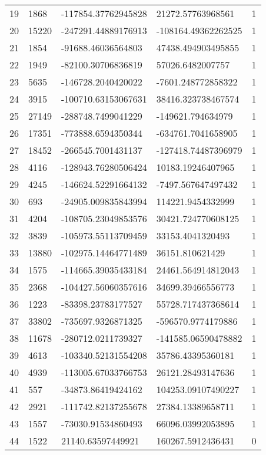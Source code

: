 \begin{longtable}{lllll}
    19 & 1868 & -117854.37762945828 & 21272.57763968561 & 1 \\
    20 & 15220 & -247291.44889176913 & -108164.49362262525 & 1 \\
    21 & 1854 & -91688.46036564803 & 47438.494903495855 & 1 \\
    22 & 1949 & -82100.30706836819 & 57026.6482007757 & 1 \\
    23 & 5635 & -146728.2040420022 & -7601.248772858322 & 1 \\
    24 & 3915 & -100710.63153067631 & 38416.323738467574 & 1 \\
    25 & 27149 & -288748.7499041229 & -149621.794634979 & 1 \\
    26 & 17351 & -773888.6594350344 & -634761.7041658905 & 1 \\
    27 & 18452 & -266545.7001431137 & -127418.74487396979 & 1 \\
    28 & 4116 & -128943.76280506424 & 10183.19246407965 & 1 \\
    29 & 4245 & -146624.52291664132 & -7497.567647497432 & 1 \\
    30 & 693 & -24905.009835843994 & 114221.9454332999 & 1 \\
    31 & 4204 & -108705.23049853576 & 30421.724770608125 & 1 \\
    32 & 3839 & -105973.55113709459 & 33153.4041320493 & 1 \\
    33 & 13880 & -102975.14464771489 & 36151.810621429 & 1 \\
    34 & 1575 & -114665.39035433184 & 24461.564914812043 & 1 \\
    35 & 2368 & -104427.56060357616 & 34699.39466556773 & 1 \\
    36 & 1223 & -83398.23783177527 & 55728.717437368614 & 1 \\
    37 & 33802 & -735697.9326871325 & -596570.9774179886 & 1 \\
    38 & 11678 & -280712.0211739327 & -141585.06590478882 & 1 \\
    39 & 4613 & -103340.52131554208 & 35786.43395360181 & 1 \\
    40 & 4939 & -113005.67033766753 & 26121.28493147636 & 1 \\
    41 & 557 & -34873.86419424162 & 104253.09107490227 & 1 \\
    42 & 2921 & -111742.82137255678 & 27384.13389658711 & 1 \\
    43 & 1557 & -73030.91534860493 & 66096.03992053895 & 1 \\
    44 & 1522 & 21140.63597449921 & 160267.5912436431 & 0 \\

\end{longtable}

